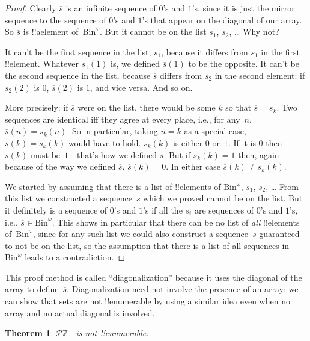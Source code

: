 \documentclass[10pt,a4paper]{article}
\theoremstyle{plain}
\newtheorem{thm}{Theorem}[section]
\theoremstyle{definition}
\theoremstyle{remark}
\newenvironment{explain}{}{}
\newcommand*{\ollabel}[1]{\label{#1}}
\providecommand{\PosInt}{\mathbb{Z}^{+}}
\providecommand{\Bin}{\mathrm{Bin}}
\providecommand{\Pow}{\mathcal{P}}
\begin{document}
\begin{proof}
Clearly $\overline{s}$ is an infinite sequence of $0$'s and
$1$'s, since it is just the mirror sequence to the sequence of $0$'s
and $1$'s that appear on the diagonal of our array.  So $\overline{s}$
is !!a{element} of~$\Bin^\omega$.  But it cannot be on the list $s_1$,
$s_2$, \dots{} Why not?

It can't be the first sequence in the list, $s_1$, because it differs from
$s_1$ in the first !!{element}.  Whatever $s_1(1)$ is, we defined
$\overline{s}(1)$ to be the opposite.  It can't be the second
sequence in the list, because $\overline{s}$ differs from $s_2$ in the second
element: if $s_2(2)$ is $0$, $\overline{s}(2)$ is $1$, and vice
versa. And so on.

More precisely: if $\overline{s}$ were on the list, there would be
some $k$ so that $\overline{s} = s_{k}$.  Two sequences are identical
iff they agree at every place, i.e., for any~$n$, $\overline{s}(n) =
s_{k}(n)$.  So in particular, taking $n = k$ as a special case,
$\overline{s}(k) = s_{k}(k)$ would have to hold. $s_k(k)$ is either
$0$ or~$1$. If it is $0$ then $\overline{s}(k)$ must be~$1$---that's
how we defined $\overline{s}$. But if $s_k(k) = 1$ then, again because
of the way we defined $\overline{s}$, $\overline{s}(k) = 0$. In either
case $\overline{s}(k) \neq s_{k}(k)$.

We started by assuming that there is a list of !!{element}s of
$\Bin^\omega$, $s_1$, $s_2$, \dots{} From this list we constructed a
sequence~$\overline{s}$ which we proved cannot be on the list.  But it
definitely is a sequence of $0$'s and $1$'s if all the $s_i$ are
sequences of $0$'s and $1$'s, i.e., $\overline{s} \in
\Bin^\omega$. This shows in particular that there can be no list of
\emph{all} !!{element}s of~$\Bin^\omega$, since for any such list we
could also construct a sequence~$\overline{s}$ guaranteed to not be on
the list, so the assumption that there is a list of all sequences
in~$\Bin^\omega$ leads to a contradiction.
\end{proof}

\begin{explain}
This proof method is called ``diagonalization'' because it uses the
diagonal of the array to define~$\overline{s}$. Diagonalization need
not involve the presence of an array: we can show that sets are not
!!{enumerable} by using a similar idea even when no array and no
actual diagonal is involved.
\end{explain}

\begin{thm}
\ollabel{thm:nonenum-pownat}
$\Pow{\PosInt}$ is not !!{enumerable}.
\end{thm}
\end{document}
